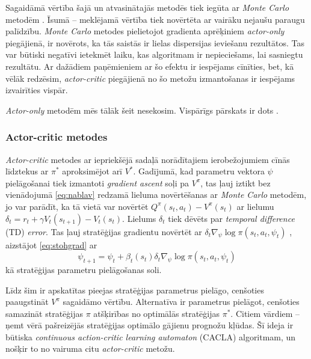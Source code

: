 \documentclass{ludis} %
\begin{document}
Sagaidāmā vērtība šajā un atvasinātajās metodēs tiek iegūta ar \textit{Monte
  Carlo} metodēm \autocite{halton1970retrospective}. Īsumā -- meklējamā vērtība
tiek novērtēta ar vairāku nejaušu paraugu palīdzību. \textit{Monte Carlo}
metodes pielietojot gradienta aprēķiniem \textit{actor-only} piegājienā, ir
novērots, ka tās saistās ir lielas dispersijas ieviešanu rezultātos. Tas var
būtiski negatīvi ietekmēt laiku, kas algoritmam ir nepieciešams, lai sasniegtu
rezultātu. Ar dažādiem paņēmieniem ar šo efektu ir iespējams cīnīties, bet, kā
vēlāk redzēsim, \textit{actor-critic} piegājienā no šo metožu izmantošanas ir
iespējams izvairīties vispār. %

\textit{Actor-only} metodēm mēs tālāk šeit nesekosim.
Vispārīgs pārskats ir dots \autocite{Hasselt2012}.
 
\subsubsection{Actor-critic metodes}
\textit{Actor-critic} metodes ar iepriekšējā sadaļā norādītajiem ierobežojumiem
cīnās līdztekus ar $\pi^*$ aproksimējot arī $V^*$. Gadījumā, kad parametru
vektora $\psi$ pielāgošanai tiek izmantoti \textit{gradient ascent} soļi pa
$V^\pi$, tas ļauj iztikt bez vienādojumā \eqref{eq:nablav} redzamā lieluma
novērtēšanas ar \textit{Monte Carlo} metodēm, jo var parādīt, ka tā vietā var
novērtēt $Q^\pi(s_t, a_t) - V^\pi(s_t)$ ar lielumu $\delta_t = r_{t} + \gamma
V_t(s_{t+1}) - V_t(s_t)$. Lielums $\delta_t$ tiek dēvēts par \textit{temporal
  difference} (TD) \textit{error}. Tas ļauj stratēģijas gradientu novērtēt ar
$\delta_t \nabla_\psi \log \pi(s_t,a_t,\psi_t)$ \autocite{sutton2000policy},
aizstājot \eqref{eq:stohgrad} ar
\begin{equation} \label{eq:psi}
	\psi_{t+1} = \psi_t + \beta_t(s_t) \delta_t \nabla_\psi \log \pi(s_t,a_t,\psi_t)
\end{equation}
kā stratēģijas parametru pielāgošanas soli.

Līdz šim ir apskatītas pieejas stratēģijas parametrus pielāgo, cenšoties
paaugstināt $V^\pi$ sagaidāmo vērtību. Alternatīva ir parametrus pielāgot,
cenšoties samazināt stratēģijas $\pi$ atšķirības no optimālās stratēģijas
$\pi^*$. Citiem vārdiem -- ņemt vērā pašreizējās stratēģijas optimālo gājienu
prognožu kļūdas. Šī ideja ir būtiska \textit{continuous action-critic learning
  automaton} (CACLA) algoritmam, un nošķir to no vairuma citu
\textit{actor-critic} metožu.
\end{document}
